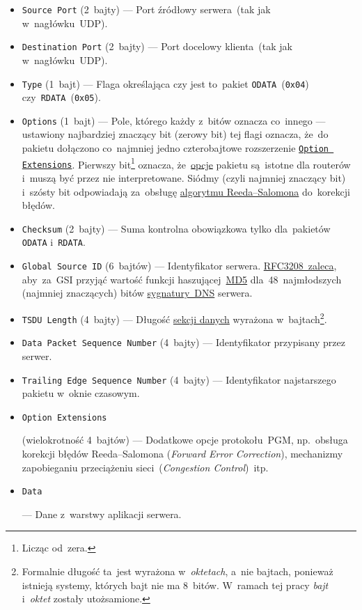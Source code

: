 \documentclass[thesis]{subfiles}
\begin{document}
\begin{itemize}
	\item \texttt{Source~Port} (2~bajty) --- Port źródłowy serwera~(tak jak w~nagłówku~UDP).
	\item \texttt{Destination~Port} (2~bajty) --- Port docelowy klienta~(tak jak w~nagłówku~UDP).
	\item \texttt{Type} (1~bajt) --- Flaga określająca czy jest to~pakiet \texttt{ODATA}~(\texttt{0x04}) czy~\texttt{RDATA}~(\texttt{0x05}).
	\item \texttt{Options} (1~bajt) --- Pole, którego każdy z~bitów oznacza co~innego --- ustawiony najbardziej znaczący bit (zerowy bit) tej flagi oznacza, że~do pakietu dołączono co~najmniej jedno czterobajtowe rozszerzenie \hyperlink{itm:optext}{\texttt{Option Extensions}}. Pierwszy bit\footnote{Licząc od~zera.} oznacza, że~\hyperlink{itm:optext}{opcje} pakietu są~istotne dla routerów i~muszą być przez nie interpretowane. Siódmy (czyli najmniej znaczący bit) i~szósty bit odpowiadają za~obsługę \href{https://en.wikipedia.org/wiki/Reed\%E2\%80\%93Solomon\_error\_correction}{algorytmu Reeda--Salomona} do~korekcji błędów.
	\item \texttt{Checksum} (2~bajty) --- Suma kontrolna obowiązkowa tylko dla~pakietów \texttt{ODATA} i~\texttt{RDATA}.
	\item \texttt{Global Source~ID} (6~bajtów) --- Identyfikator serwera. \href{https://tools.ietf.org/html/rfc3208\#page-33}{RFC3208~zaleca}, aby~za~GSI przyjąć wartość funkcji haszującej~\href{https://en.wikipedia.org/wiki/MD5}{MD5} dla~48~najmłodszych (najmniej znaczących) bitów \href{https://tools.ietf.org/html/rfc2535\#section-4}{sygnatury~DNS} serwera.
	\item \texttt{TSDU~Length} (4~bajty) --- Długość \hyperlink{itm:datasec}{sekcji danych} wyrażona w~bajtach\footnote{Formalnie długość ta~jest wyrażona w~\emph{oktetach}, a~nie bajtach, ponieważ istnieją systemy, których bajt nie ma 8~bitów. W~ramach tej pracy \emph{bajt} i~\emph{oktet} zostały utożsamione.}.
	\item \texttt{Data Packet Sequence Number} (4~bajty) --- Identyfikator przypisany przez serwer.
	\item \texttt{Trailing Edge Sequence Number} (4~bajty) --- Identyfikator najstarszego pakietu w~oknie czasowym.
	\item \hypertarget{itm:optext}{\texttt{Option Extensions}} (wielokrotność 4~bajtów) --- Dodatkowe opcje protokołu~PGM, np.~obsługa korekcji błędów Reeda--Salomona (\emph{Forward Error Correction}), mechanizmy zapobieganiu przeciążeniu sieci~(\emph{Congestion Control})~itp.
	\item \hypertarget{itm:datasec}{\texttt{Data}} --- Dane z~warstwy aplikacji serwera.
\end{itemize}
\end{document}
